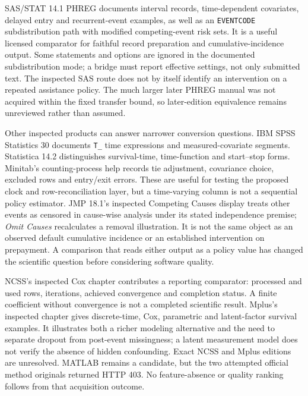 SAS/STAT 14.1 PHREG documents interval records, time-dependent covariates,
delayed entry and recurrent-event examples, as well as an
\texttt{EVENTCODE} subdistribution path with modified competing-event risk
sets. It is a useful licensed comparator for faithful record preparation and
cumulative-incidence output. Some statements and options are ignored in the
documented subdistribution mode; a bridge must report effective settings,
not only submitted text. The inspected SAS route does not by itself identify
an intervention on a repeated assistance policy. The much larger later PHREG
manual was not acquired within the fixed transfer bound, so later-edition
equivalence remains unreviewed rather than assumed.
\citep{exec14_survival_sas}

Other inspected products can answer narrower conversion questions. IBM SPSS
Statistics 30 documents \texttt{T\_} time expressions and measured-covariate
segments. Statistica 14.2 distinguishes survival-time, time-function and
start--stop forms. Minitab's counting-process help records tie adjustment,
covariance choice, excluded rows and entry/exit errors. These are useful for
testing the proposed clock and row-reconciliation layer, but a time-varying
column is not a sequential policy estimator. JMP 18.1's inspected
Competing Causes display treats other events as censored in cause-wise
analysis under its stated independence premise; \emph{Omit Causes}
recalculates a removal illustration. It is not the same object as an
observed default cumulative incidence or an established intervention on
prepayment. A comparison that reads either output as a policy value has
changed the scientific question before considering software quality.
\citep{exec14_survival_ibm,exec14_survival_statistica,exec14_survival_minitab,exec14_survival_jmp}

NCSS's inspected Cox chapter contributes a reporting comparator: processed
and used rows, iterations, achieved convergence and completion status. A
finite coefficient without convergence is not a completed scientific result.
Mplus's inspected chapter gives discrete-time, Cox, parametric and latent-factor
survival examples. It illustrates both a richer modeling alternative and the
need to separate dropout from post-event missingness; a latent measurement
model does not verify the absence of hidden confounding. Exact NCSS and Mplus
editions are unresolved. MATLAB remains a candidate, but the two attempted
official method originals returned HTTP 403. No feature-absence or quality
ranking follows from that acquisition outcome.
\citep{exec14_survival_ncss,exec14_survival_mplus,exec16_commercial_matrix}

